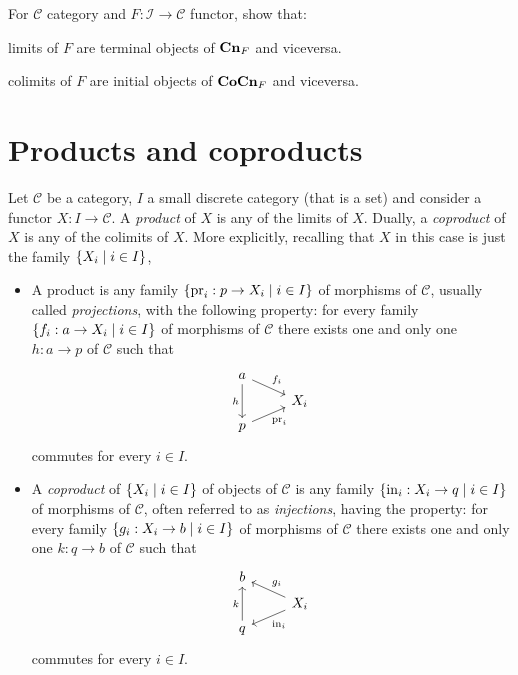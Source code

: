\begin{exercise}
  For \(\mathcal{C}\) category and \(F : \mathcal{I} \to \mathcal{C}\) functor, show that:
  \begin{tcbitem}
  \item limits of \(F\) are terminal objects of \(\mathbf{Cn}_F\) and viceversa.
  \item colimits of \(F\) are initial objects of \(\mathbf{CoCn}_F\) and
    viceversa.
  \end{tcbitem}
\end{exercise}



\section{Products and coproducts}

\begin{definition}
  Let \(\mathcal{C}\) be a category, \(I\) a small discrete category (that is
  a set) and consider a functor \(X : I \to \mathcal{C}\). A {\em
    product} of \(X\) is any of the limits of \(X\). Dually, a {\em
    coproduct} of \(X\) is any of the colimits of \(X\). More
  explicitly, recalling that \(X\) in this case
  is just the family \(\left\{X_i \mid i \in I\right\}\),
  \begin{itemize}[leftmargin=*]
  \item A product is any family
    \(\left\{\operatorname{pr}_i : p \to X_i \mid i \in I\right\}\) of morphisms of
    \(\mathcal{C}\), usually called {\em projections}, with the following
    property: for every family \(\left\{f_i : a \to X_i \mid i \in I\right\}\) of
    morphisms of \(\mathcal{C}\) there exists one and only one
    \(h : a \to p\) of \(\mathcal{C}\) such that
    \[
      \begin{tikzcd}[row sep=tiny]
        a \ar["h", dd, swap] \ar["{f_i}", dr] \\
        & X_i \\
        p \ar["{\proj_i}", ur, swap]
      \end{tikzcd}
    \]
    commutes for every \(i \in I\).
  \item A {\em coproduct} of \(\left\{X_i \mid i \in I\right\}\) of objects of
    \(\mathcal{C}\) is any family \(\left\{\operatorname{in}_i : X_i \to q \mid i \in I\right\}\) of
    morphisms of \(\mathcal{C}\), often referred to as {\em injections},
    having the property: for every family
    \(\left\{g_i : X_i \to b \mid i \in I\right\}\) of morphisms of \(\mathcal{C}\) there
    exists one and only one \(k : q \to b\) of \(\mathcal{C}\) such that
    \[
      \begin{tikzcd}[row sep=tiny]
        b \\
        & X_i \ar["{\inj_i}", dl] \ar["{g_i}", ul, swap] \\
        q \ar["k", uu]
      \end{tikzcd}
    \]
    commutes for every \(i \in I\).
  \end{itemize}
\end{definition}

